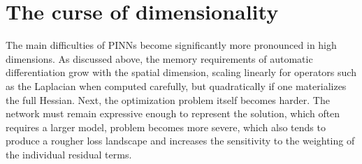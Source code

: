 %
%
%
%
%
%


\section{The curse of dimensionality}

%
%
The main difficulties of PINNs become significantly more pronounced in high dimensions.
As discussed above, the memory requirements of automatic differentiation grow with the spatial dimension, scaling linearly for operators such as the Laplacian when computed carefully, but quadratically if one materializes the full Hessian.
Next, the optimization problem itself becomes harder.
The network must remain expressive enough to represent the solution, which often requires a larger model, problem becomes more severe, which also tends to produce a rougher loss landscape and increases the sensitivity to the weighting of the individual residual terms.

